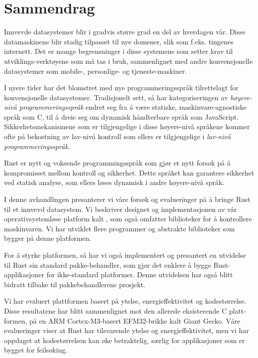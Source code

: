 
\chapter{Sammendrag}
\label{chap:sammendrag}

Innvevde datasystemer blir i gradvis større grad en del av hverdagen vår.
Disse datamaskinene blir stadig tilpasset til nye domener, slik som f.eks. tingenes internett.
Det er mange begrensninger i disse systemene som setter krav til utviklings-verktøyene som må tas i bruk, sammenlignet med andre konvensjonelle datasystemer som mobile-, personlige- og tjeneste-maskiner.

I nyere tider har det blomstret med nye programmeringsspråk tilrettelagt for konvensjonelle datasystemer.
Tradisjonelt sett, så har kategoriseringen av \emph{høyere-nivå programmeringsspråk} endret seg fra å være statiske, maskinvare-agnostiske språk som C, til å dreie seg om dynamisk håndterbare språk som JavaScript.
Sikkerhetsmekanismene som er tilgjengelige i disse høyere-nivå språkene kommer ofte på bekostning av lav-nivå kontroll som ellers er tilgjengelige i \emph{lav-nivå programmeringsspråk}.

Rust er nytt og voksende programmingsspråk som gjør et nytt forsøk på å kompromisset mellom kontroll og sikkerhet.
Dette språket kan garantere sikkerhet ved statisk analyse, som ellers løses dynamisk i andre høyere-nivå språk.

I denne avhandlingen presanterer vi våre forsøk og evalueringer på å bringe Rust til et innvevd datasystem.
Vi beskriver designet og implementasjonen av vår operativsystemløse platform kalt {\rg}, som også omfatter biblioteker for å kontrollere maskinvaren.
Vi har utviklet flere programmer og abstrakte biblioteker som bygger på denne platformen.

For å styrke platformen, så har vi også implementert og presantert en utvidelse til Rust sin standard pakke-behandler, som gjør det enklere å bygge Rust-applikasjoner for ikke-standard platformer.
Denne utvidelsen har også blitt bidratt tilbake til pakkebehandlerens prosjekt.

Vi har evaluert plattformen basert på ytelse, energieffektivitet og kodestørrelse.
Disse resultatene har blitt sammenlignet mot den allerede eksisterende C platt-formen, på en ARM Cortex-M3-basert EFM32-brikke kalt Giant Gecko.
Våre evalueringer viser at Rust har tilsvarende ytelse og energieffektivitet, men vi har oppdaget at kodestørrelsen kan øke betraktelig, særlig for applikasjoner som er bygget for feilsøking.
